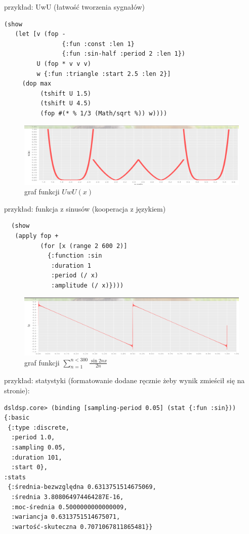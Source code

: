 \documentclass[12pt]{article}
\begin{document}
przykład: UwU (łatwość tworzenia sygnałów)
\begin{verbatim}
(show
   (let [v (fop -
                {:fun :const :len 1}
                {:fun :sin-half :period 2 :len 1})
         U (fop * v v v)
         w {:fun :triangle :start 2.5 :len 2}]
     (dop max
          (tshift U 1.5)
          (tshift U 4.5)
          (fop #(* % 1/3 (Math/sqrt %)) w))))
\end{verbatim}
\begin{figure}[H]
	\includegraphics[width=\linewidth]{uwu.png}
	\caption{graf funkcji $UwU(x)$}
\end{figure}
przykład: funkcja z sinusów (kooperacja z językiem)
\begin{verbatim}
  (show
   (apply fop +
          (for [x (range 2 600 2)]
            {:function :sin
             :duration 1
             :period (/ x)
             :amplitude (/ x)})))
\end{verbatim}
\begin{figure}[H]
	\includegraphics[width=\linewidth]{trujkot.png}
	\caption{graf funkcji $\sum_{n=1}^{n<300} \frac{\sin 2nx}{2n}$}
\end{figure}
przykład: statystyki (formatowanie dodane ręcznie żeby wynik zmieścił się na stronie):
\begin{verbatim}
dsldsp.core> (binding [sampling-period 0.05] (stat {:fun :sin}))
{:basic
 {:type :discrete,
  :period 1.0,
  :sampling 0.05,
  :duration 101,
  :start 0},
:stats
 {:średnia-bezwzględna 0.6313751514675069,
  :średnia 3.808064974464287E-16,
  :moc-średnia 0.5000000000000009,
  :wariancja 0.6313751514675071,
  :wartość-skuteczna 0.7071067811865481}}
\end{verbatim}
\cite{instrukcja}
\renewcommand\refname{Bibliografia}


\end{document}
